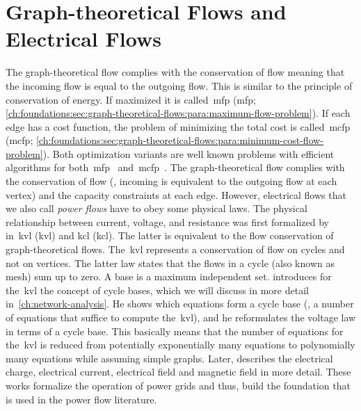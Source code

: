 \section{Graph-theoretical Flows and Electrical Flows}
\label{ch:related-work:sec:gt-flows-power-flows}
% 
The graph-theoretical flow complies with the conservation of flow meaning that
the incoming flow is equal to the outgoing flow. This is similar to the
principle of conservation of energy. If maximized it is called~\acrlong{mfp}
(\gls{mfp};
\cref{ch:foundations:sec:graph-theoretical-flows:para:maximum-flow-problem}). If
each edge has a cost function, the problem of minimizing the total cost is
called~\acrlong{mcfp} (\gls{mcfp};
\cref{ch:foundations:sec:graph-theoretical-flows:para:minimum-cost-flow-problem}).
Both optimization variants are well known problems with efficient algorithms for
both~\gls{mfp}~\parencite{Gol14}
and~\gls{mcfp}~\parencite{Gol89,Edm72,Kle67,Orl97,Gol90}. The graph-theoretical
flow complies with the conservation of flow (\ie, incoming is equivalent to the
outgoing flow at each vertex) and the capacity constraints at each edge.
However, electrical flows that we also call \emph{power flows} have to obey some
physical laws. The physical relationship between current, voltage, and
resistance was first formalized by~\textcite{Kir47} in~\acrlong{kvl} (\gls{kvl})
and \acrlong{kcl} (\gls{kcl}). The latter is equivalent to the flow conservation
of graph-theoretical flows. The~\gls{kvl} represents a conservation of flow on
cycles and not on vertices. The latter law states that the flows in a cycle
(also known as mesh) sum up to zero. A base is a maximum independent set.
\citeauthor{Kir47} introduces for the~\gls{kvl} the concept of cycle bases,
which we will discuss in more detail in~\cref{ch:network-analysis}. He shows
which equations form a cycle base (\ie, a number of equations that suffice to
compute the~\gls{kvl}), and he reformulates the voltage law in terms of a cycle
base. This basically means that the number of equations for the~\gls{kvl} is
reduced from potentially exponentially many equations to polynomially many
equations while assuming simple graphs. Later, \textcite{Max65} describes the
electrical charge, electrical current, electrical field and magnetic field in
more detail. These works formalize the operation of power grids and thus, build
the foundation that is used in the power flow literature.
 
